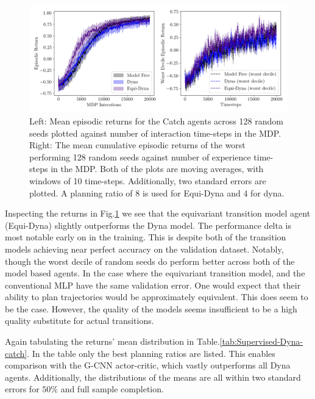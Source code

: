 \begin{figure}
	\centering
	\includegraphics[width=\textwidth]{Figures/Expert_dyna_catch_best.png}
	\caption{Left: Mean episodic returns for the Catch agents across 128 random seeds
		plotted against number of interaction time-steps in the MDP. Right: The mean
		cumulative episodic returns of the worst performing 128 random seeds against
		number of experience time-steps in the MDP. Both of the plots are moving
		averages, with windows of 10 time-steps. Additionally, two standard errors are
		plotted. A planning ratio of 8 is used for Equi-Dyna and 4 for dyna.}
	\label{fig:Supervised-Dyna-catch}
\end{figure}

Inspecting the returns in Fig.\ref{fig:Supervised-Dyna-catch} we see that the equivariant transition model agent (Equi-Dyna) slightly outperforms the Dyna model. The performance delta is most notable early on in the training. This is despite both of the transition models achieving near perfect accuracy on the validation dataset. Notably, though the worst decile of random seeds do perform better across both of the model based agents. In the case where the equivariant transition model, and the conventional MLP have the same validation error. One would expect that their ability to plan trajectories would be approximately equivalent. This does seem to be the case. However, the quality of the models seems insufficient to be a high quality substitute for actual transitions.

Again tabulating the returns' mean distribution in Table.\ref{tab:Supervised-Dyna-catch}. In the table only the best planning ratios are listed. This enables comparison with the G-CNN actor-critic, which vastly outperforms all Dyna agents. Additionally, the distributions of the means are all within two standard errors for $50 \%$ and full sample completion.

